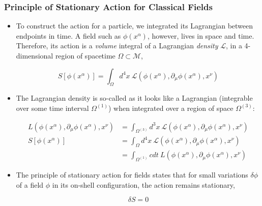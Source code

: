 \documentclass{beamer}
\begin{document}
\begin{frame}
\frametitle{Principle of Stationary Action for Classical Fields}

\begin{center}
\end{center}

\begin{itemize}
\item To construct the action for a particle, we integrated its Lagrangian between endpoints in time. A field such as $\phi \left( x^\alpha \right)$, however, lives in space and time. Therefore, its action is a \emph{volume} integral of a Lagrangian \emph{density} $\mathcal{L}$, in a 4-dimensional region of spacetime $\Omega \subset \mathcal{M}$,

$$\boxed{S \left[ \phi \left( x^\alpha \right) \right] = \int_\Omega d^4 x \: \mathcal{L} \left( \phi \left( x^\alpha \right), \partial_\mu \phi \left( x^\alpha \right), x^\nu \right)}$$
\end{itemize}
\end{frame}

\begin{frame}
\begin{itemize}
\item The Lagrangian density is so-called as it looks like a Lagrangian (integrable over some time interval $\Omega^{\left( 1 \right)}$) when integrated over a region of space $\Omega^{\left( 3 \right)}$:

\begin{align*}
L \left( \phi \left( x^\alpha \right), \partial_\mu \phi \left( x^\alpha \right), x^\nu \right) & = \int_{\Omega^{\left( 3 \right)}} d^3 x \: \mathcal{L} \left( \phi \left( x^\alpha \right), \partial_\mu \phi \left( x^\alpha \right), x^\nu \right) \\
S \left[ \phi \left( x^\alpha \right) \right] & = \int_\Omega d^4 x \: \mathcal{L} \left( \phi \left( x^\alpha \right), \partial_\mu \phi \left( x^\alpha \right), x^\nu \right) \\
& = \int_{\Omega^{\left( 1 \right)}} c dt \: L \left( \phi \left( x^\alpha \right), \partial_\mu \phi \left( x^\alpha \right), x^\nu \right)
\end{align*}

\item The principle of stationary action for fields states that for small variations $\delta \phi$ of a field $\phi$ in its on-shell configuration, the action remains stationary,

$$\boxed{\delta S = 0}$$
\end{itemize}
\end{frame}
\end{document}
